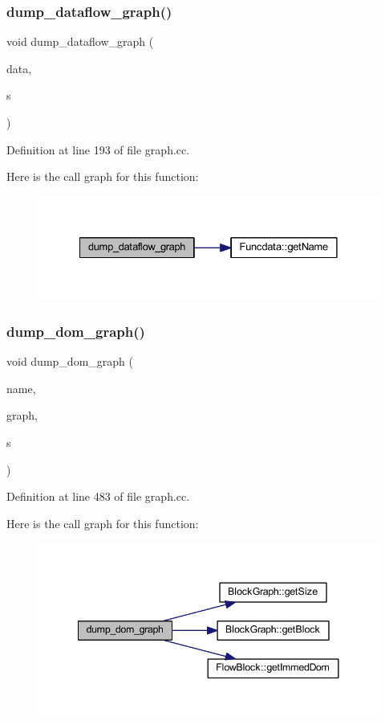 \subsubsection{\texorpdfstring{dump\_dataflow\_graph()}{dump\_dataflow\_graph()}}
{\footnotesize\ttfamily void dump\+\_\+dataflow\+\_\+graph (\begin{DoxyParamCaption}\item[{\mbox{\hyperlink{class_funcdata}{Funcdata}} \&}]{data,  }\item[{ostream \&}]{s }\end{DoxyParamCaption})}



Definition at line 193 of file graph.\+cc.

Here is the call graph for this function\+:
\nopagebreak
\begin{figure}[H]
\begin{center}
\leavevmode
\includegraphics[width=328pt]{graph_8hh_a914703798090e36fa19da547f0654100_cgraph}
\end{center}
\end{figure}
\mbox{\label{graph_8hh_ab3b7b64dd44b81ae503239ecfaa66757}} 
\subsubsection{\texorpdfstring{dump\_dom\_graph()}{dump\_dom\_graph()}}
{\footnotesize\ttfamily void dump\+\_\+dom\+\_\+graph (\begin{DoxyParamCaption}\item[{const string \&}]{name,  }\item[{const \mbox{\hyperlink{class_block_graph}{Block\+Graph}} \&}]{graph,  }\item[{ostream \&}]{s }\end{DoxyParamCaption})}



Definition at line 483 of file graph.\+cc.

Here is the call graph for this function\+:
\nopagebreak
\begin{figure}[H]
\begin{center}
\leavevmode
\includegraphics[width=341pt]{graph_8hh_ab3b7b64dd44b81ae503239ecfaa66757_cgraph}
\end{center}
\end{figure}
